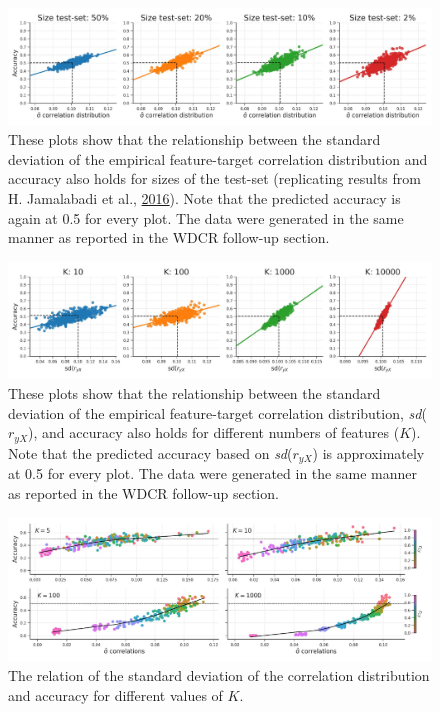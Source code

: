 \documentclass[11pt,american,]{memoir} %
\begin{document}
\begin{figure}
\centering
\includegraphics{_bookdown_files/confounds-decoding-files/figures/figure_S16.pdf}
\caption{\label{fig:fig-confounds-decoding-S16}These plots show that the relationship between the standard deviation of the empirical feature-target correlation distribution and accuracy also holds for sizes of the test-set (replicating results from H. Jamalabadi et al., \protect\hyperlink{ref-Jamalabadi2016-gr}{2016}). Note that the predicted accuracy is again at 0.5 for every plot. The data were generated in the same manner as reported in the WDCR follow-up section.}
\end{figure}



\begin{figure}
\centering
\includegraphics{_bookdown_files/confounds-decoding-files/figures/figure_S17.pdf}
\caption{\label{fig:fig-confounds-decoding-S17}These plots show that the relationship between the standard deviation of the empirical feature-target correlation distribution, \emph{sd}(\(r_{yX}\)), and accuracy also holds for different numbers of features (\(K\)). Note that the predicted accuracy based on \emph{sd}(\(r_{yX}\)) is approximately at 0.5 for every plot. The data were generated in the same manner as reported in the WDCR follow-up section.}
\end{figure}



\begin{figure}
\centering
\includegraphics{_bookdown_files/confounds-decoding-files/figures/figure_S18.pdf}
\caption{\label{fig:fig-confounds-decoding-S18}The relation of the standard deviation of the correlation distribution and accuracy for different values of \(K\).}
\end{figure}
\end{document}
